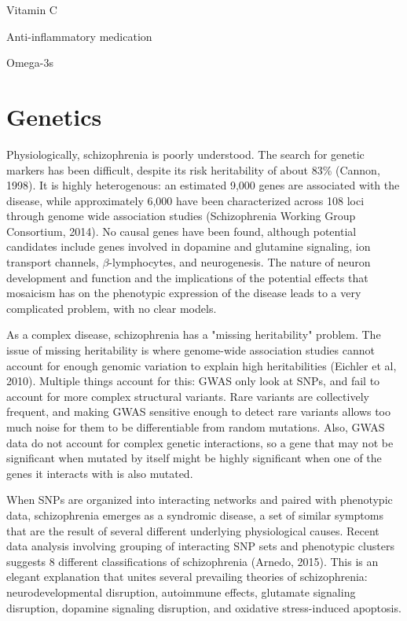 \documentclass[12pt,twoside]{reedthesis}
\begin{document}
	Vitamin C 
	
	Anti-inflammatory medication 
	
	Omega-3s
	
	\section{Genetics}
	Physiologically, schizophrenia is poorly understood. The search for genetic markers has been difficult, despite its risk heritability of about 83\% (Cannon, 1998). It is highly heterogenous: an estimated 9,000 genes are associated with the disease, while approximately 6,000 have been characterized across 108 loci through genome wide association studies (Schizophrenia Working Group Consortium, 2014). No causal genes have been found, although potential candidates include genes involved in dopamine and glutamine signaling, ion transport channels, $\beta$-lymphocytes, and neurogenesis. The nature of neuron development and function and the implications of the potential effects that mosaicism has on the phenotypic expression of the disease leads to a very complicated problem, with no clear models. 
	
	As a complex disease, schizophrenia has a "missing heritability" problem. The issue of missing heritability is where genome-wide association studies cannot account for enough genomic variation to explain high heritabilities (Eichler et al, 2010). Multiple things account for this: GWAS only look at SNPs, and fail to account for more complex structural variants. Rare variants are collectively frequent, and making GWAS sensitive enough to detect rare variants allows too much noise for them to be differentiable from random mutations. Also, GWAS data do not account for complex genetic interactions, so a gene that may not be significant when mutated by itself might be highly significant when one of the genes it interacts with is also mutated.  
	
	When SNPs are organized into interacting networks and paired with phenotypic data, schizophrenia emerges as a syndromic disease, a set of similar symptoms that are the result of several different underlying physiological causes. Recent data analysis involving grouping of interacting SNP sets and phenotypic clusters suggests 8 different classifications of schizophrenia (Arnedo, 2015). This is an elegant explanation that unites several prevailing theories of schizophrenia: neurodevelopmental disruption, autoimmune effects, glutamate signaling disruption, dopamine signaling disruption, and oxidative stress-induced apoptosis.  
	
\end{document}
